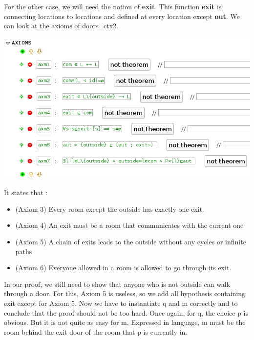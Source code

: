 \[
\]
For the other case, we will need the notion of \textbf{exit}. This function \textbf{exit} is connecting locations to locations and defined at every location except \textbf{out}. 
We can look at the axioms of doors\_ctx2. 
\begin{center}
	\includegraphics[]{img/tutorial/tut_10_axioms.png}
\end{center}

It states that :

\begin{itemize}
	\item (Axiom 3) Every room except the outside has exactly one exit. 
	\item (Axiom 4) An exit must be a room that communicates with the current one
	\item (Axiom 5) A chain of exits leads to the outside without any cycles or infinite paths
	\item (Axiom 6) Everyone allowed in a room is allowed to go through its exit. 
\end{itemize}  

In our proof, we still need to show that anyone who is not outside can walk through a door. For this, Axiom 5 is useless, so we add all hypothesis containing exit except for Axiom 5. Now we have to instantiate q and m correctly and to conclude that the proof should not be too hard. Once again, for q, the choice p is obvious. But it is not quite as easy for m. Expressed in language, m must be the room behind the exit door of the room that p is currently in. 


